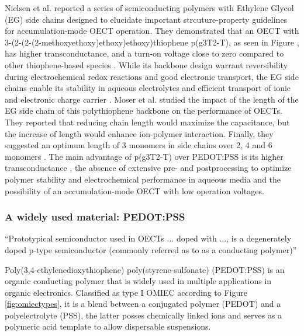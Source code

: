 Nielsen et al. reported a series of semiconducting polymers with Ethylene Glycol (EG) side chains designed to elucidate important strcuture-property guidelines for accumulation-mode OECT operation. They demonstrated that an OECT with 3-(2-(2-(2-methoxyethoxy)ethoxy)ethoxy)thiophene p(g3T2-T), as seen in Figure , has higher transconductance, and a turn-on voltage close to zero compared to other thiophene-based species \cite{nielsenMolecularDesignSemiconducting2016}. While its backbone design warrant reversibility during electrochemical redox reactions and good electronic transport, the EG side chains enable its stability in aqueous electrolytes and efficient transport of ionic and electronic charge carrier \cite{moiaDesignEvaluationConjugated2019}. Moser et al. studied the impact of the length of the EG side chain of this polythiophene backbone on the performance of OECTs. They reported that reducing chain length would maximize the capacitance, but the increase of length would enhance ion-polymer interaction. Finally, they suggested an optimum length of 3 monomers in side chains over 2, 4 and 6 monomers \cite{moserEthyleneGlycolBasedSide2020}. The main advantage of p(g3T2-T) over PEDOT:PSS is its higher transconductance \cite{nielsenMolecularDesignSemiconducting2016}, the absence of extensive pre- and postprocessing to optimize polymer stability and electrochemical performance in aqueous media and the possibility of an accumulation-mode OECT with low operation voltages\cite{moserEthyleneGlycolBasedSide2020}.

\subsubsection{A widely used material: PEDOT:PSS}


``Prototypical semiconductor used in OECTs ... doped with ..., is a degenerately doped p-type semiconductor (commonly referred as to as a conducting polymer)'' \cite{bernardsSteadyStateTransientBehavior2007}

Poly(3,4-ethylenedioxythiophene) poly(styrene-sulfonate) (PEDOT:PSS) is an organic conducting polymer that is widely used in multiple applications in organic electronics. Classified as type I OMIEC according to Figure \ref{fig:omiectypes}, it is a blend between a conjugated polymer (PEDOT) and a polyelectrolyte (PSS), the latter posses chemically linked ions and serves as a polymeric acid template to allow dispersable suspensions.



